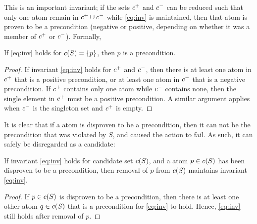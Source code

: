 \documentclass[\master/Master.tex]{subfiles}
\begin{document}
This is an important invariant; if the sets $c^+$ and $c^-$ can be reduced such that only one atom remain in $c^+ \cup c^-$ while \eqref{eq:inv} is maintained, then that atom is proven to be a precondition (negative or positive, depending on whether it was a member of $c^+$ or $c^-$). Formally,

\begin{proposition} \label{prop:ncp:precond-holds}
    If \eqref{eq:inv} holds for $c(S) = \{p\}$, then $p$ is a precondition.
\end{proposition}

\begin{proof}
    If invariant \eqref{eq:inv} holds for $c^+$ and $c^-$, then there is at least one atom in $c^+$ that is a positive precondition, or at least one atom in $c^-$ that is a negative precondition. If $c^+$ contains only one atom while $c^-$ contains none, then the single element in $c^+$ must be a positive precondition. A similar argument applies when $c^-$ is the singleton set and $c^+$ is empty.
\end{proof}

It is clear that if a atom is disproven to be a precondition, then it can not be the precondition that was violated by $S$, and caused the action to fail. As such, it can safely be disregarded as a candidate:

\begin{theorem} \label{th:invHolds}
    If invariant \eqref{eq:inv} holds for candidate set $c(S)$, and a atom $p \in c(S)$ has been disproven to be a precondition, then removal of $p$ from $c(S)$ maintains invariant \eqref{eq:inv}.
\end{theorem}

\begin{proof}
    If $p \in c(S)$ is disproven to be a precondition, then there is at least one other atom $q \in c(S)$ that is a precondition for \eqref{eq:inv} to hold. Hence, \eqref{eq:inv} still holds after removal of $p$.
\end{proof}
\end{document}
